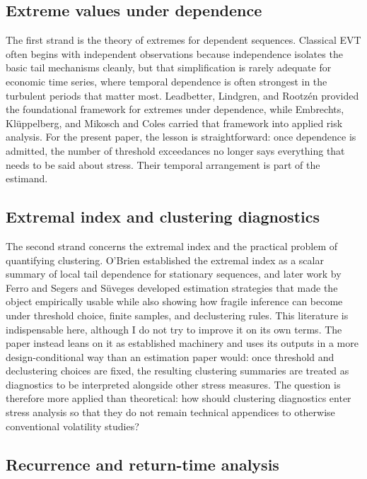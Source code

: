 \documentclass[11pt]{article}
\begin{document}
\subsection{Extreme values under dependence}

The first strand is the theory of extremes for dependent sequences. Classical EVT often begins with independent observations because independence isolates the basic tail mechanisms cleanly, but that simplification is rarely adequate for economic time series, where temporal dependence is often strongest in the turbulent periods that matter most. Leadbetter, Lindgren, and Rootz\'en \cite{leadbetter1983} provided the foundational framework for extremes under dependence, while Embrechts, Kl\"uppelberg, and Mikosch \cite{embrechts1997} and Coles \cite{coles2001} carried that framework into applied risk analysis. For the present paper, the lesson is straightforward: once dependence is admitted, the number of threshold exceedances no longer says everything that needs to be said about stress. Their temporal arrangement is part of the estimand.

\subsection{Extremal index and clustering diagnostics}

The second strand concerns the extremal index and the practical problem of quantifying clustering. O'Brien \cite{obrien1987} established the extremal index as a scalar summary of local tail dependence for stationary sequences, and later work by Ferro and Segers \cite{ferro2003} and S\"uveges \cite{suveges2007} developed estimation strategies that made the object empirically usable while also showing how fragile inference can become under threshold choice, finite samples, and declustering rules. This literature is indispensable here, although I do not try to improve it on its own terms. The paper instead leans on it as established machinery and uses its outputs in a more design-conditional way than an estimation paper would: once threshold and declustering choices are fixed, the resulting clustering summaries are treated as diagnostics to be interpreted alongside other stress measures. The question is therefore more applied than theoretical: how should clustering diagnostics enter stress analysis so that they do not remain technical appendices to otherwise conventional volatility studies?

\subsection{Recurrence and return-time analysis}
\end{document}
